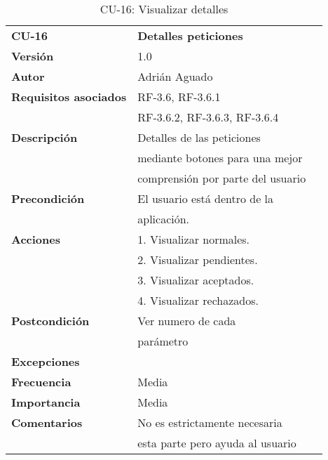 \begin{table}
\begin{tabular}{llr}  
\toprule
\begin{minipage}[b]{0.24\columnwidth}\raggedright\strut
\textbf{CU-16}\strut
\end{minipage} & \begin{minipage}[b]{0.72\columnwidth}\raggedright\strut
\textbf{Detalles peticiones}\strut
\end{minipage}\tabularnewline
\cmidrule(r){1-2}
\textbf{Versión}       & 1.0           \\
\textbf{Autor}       & Adrián  Aguado    \\
\textbf{Requisitos asociados}       & RF-3.6, RF-3.6.1  \\
& RF-3.6.2, RF-3.6.3, RF-3.6.4   \\
\textbf{Descripción} & Detalles de las peticiones\\
& mediante botones para una mejor \\
& comprensión por parte del usuario\\
\textbf{Precondición}  & El usuario está dentro de la \\
& aplicación.      \\
\textbf{Acciones} & 1. Visualizar normales. \\
& 2. Visualizar pendientes. \\
& 3. Visualizar aceptados. \\
& 4. Visualizar rechazados. \\
\textbf{Postcondición} & Ver numero de cada \\
& parámetro \\
\textbf{Excepciones} &     \\
\textbf{Frecuencia} & Media          \\
\textbf{Importancia} & Media           \\
\textbf{Comentarios } &  No es estrictamente necesaria \\
&  esta parte pero ayuda al usuario \\
\bottomrule
\end{tabular}
\caption{CU-16: Visualizar detalles} 
\end{table}

